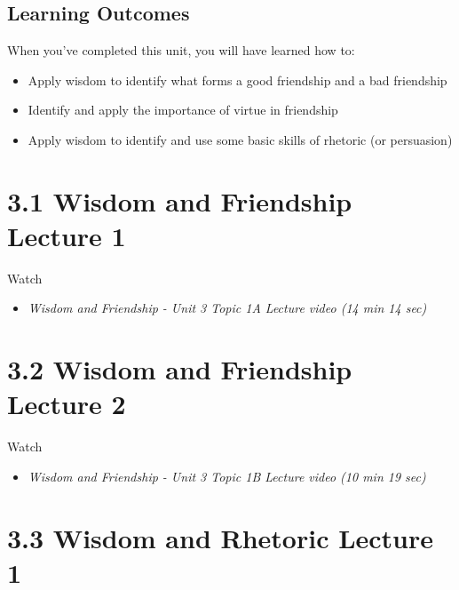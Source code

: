 \documentclass[
]{book}
\providecommand{\tightlist}{%
  \setlength{\itemsep}{0pt}\setlength{\parskip}{0pt}}
\begin{document}
\hypertarget{learning-outcomes-2}{%
\subsection*{Learning Outcomes}\label{learning-outcomes-2}}

When you've completed this unit, you will have learned how to:

\begin{itemize}
\tightlist
\item
  Apply wisdom to identify what forms a good friendship and a bad friendship
\item
  Identify and apply the importance of virtue in friendship
\item
  Apply wisdom to identify and use some basic skills of rhetoric (or persuasion)
\end{itemize}

\hypertarget{wisdom-and-friendship-lecture-1}{%
\section*{3.1 Wisdom and Friendship Lecture 1}\label{wisdom-and-friendship-lecture-1}}

Watch

\begin{itemize}
\tightlist
\item
  \emph{Wisdom and Friendship - Unit 3 Topic 1A Lecture video (14 min 14 sec)}
\end{itemize}

\hypertarget{wisdom-and-friendship-lecture-2}{%
\section*{3.2 Wisdom and Friendship Lecture 2}\label{wisdom-and-friendship-lecture-2}}

Watch

\begin{itemize}
\tightlist
\item
  \emph{Wisdom and Friendship - Unit 3 Topic 1B Lecture video (10 min 19 sec)}
\end{itemize}

\hypertarget{wisdom-and-rhetoric-lecture-1}{%
\section*{3.3 Wisdom and Rhetoric Lecture 1}\label{wisdom-and-rhetoric-lecture-1}}
\end{document}
